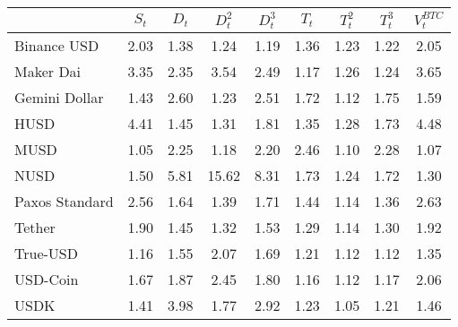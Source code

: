 \begin{tabular}{lcccccccc}
  \toprule
 & $S_{t}$ & $D_{t}$ & $D^{2}_{t}$ & $D^{3}_{t}$ & $T_{t}$ & $T^{2}_{t}$ & $T^{3}_{t}$ & $V^{BTC}_{t}$ \\ 
  \midrule
Binance USD & 2.03 & 1.38 & 1.24 & 1.19 & 1.36 & 1.23 & 1.22 & 2.05 \\ 
  Maker Dai & 3.35 & 2.35 & 3.54 & 2.49 & 1.17 & 1.26 & 1.24 & 3.65 \\ 
  Gemini Dollar & 1.43 & 2.60 & 1.23 & 2.51 & 1.72 & 1.12 & 1.75 & 1.59 \\ 
  HUSD & 4.41 & 1.45 & 1.31 & 1.81 & 1.35 & 1.28 & 1.73 & 4.48 \\ 
  MUSD & 1.05 & 2.25 & 1.18 & 2.20 & 2.46 & 1.10 & 2.28 & 1.07 \\ 
  NUSD & 1.50 & 5.81 & 15.62 & 8.31 & 1.73 & 1.24 & 1.72 & 1.30 \\ 
  Paxos Standard & 2.56 & 1.64 & 1.39 & 1.71 & 1.44 & 1.14 & 1.36 & 2.63 \\ 
  Tether & 1.90 & 1.45 & 1.32 & 1.53 & 1.29 & 1.14 & 1.30 & 1.92 \\ 
  True-USD & 1.16 & 1.55 & 2.07 & 1.69 & 1.21 & 1.12 & 1.12 & 1.35 \\ 
  USD-Coin & 1.67 & 1.87 & 2.45 & 1.80 & 1.16 & 1.12 & 1.17 & 2.06 \\ 
  USDK & 1.41 & 3.98 & 1.77 & 2.92 & 1.23 & 1.05 & 1.21 & 1.46 \\ 
   \bottomrule
\end{tabular}
